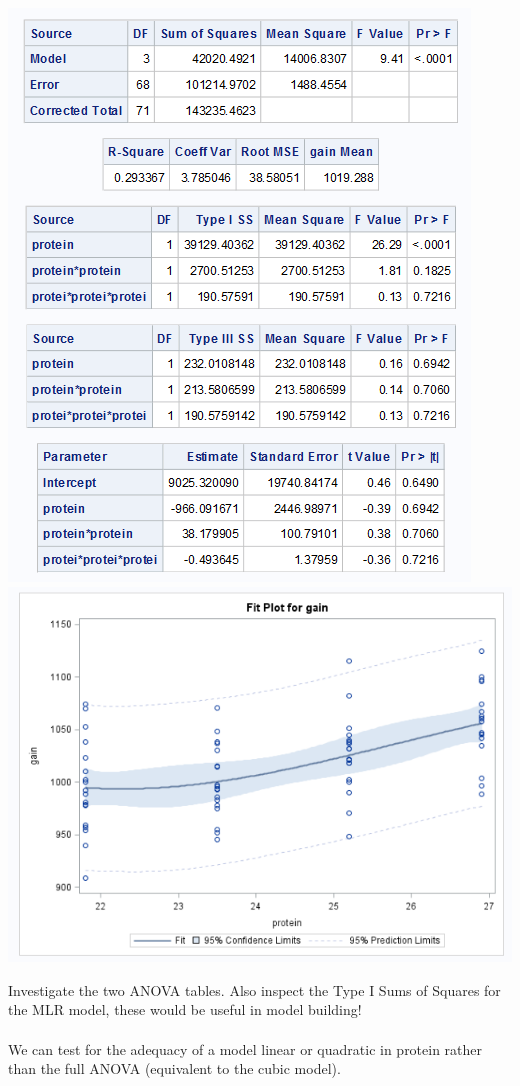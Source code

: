 \begin{flushleft}
\includegraphics[scale=0.8]{ChickensGLM2}\includegraphics[scale=0.5]{ChickensScatter}
\end{flushleft}

Investigate the two ANOVA tables.  Also inspect the Type I Sums of Squares for the MLR model, these would be useful in model building! \\~\\
We can test for the adequacy of a model linear or quadratic in protein rather than the full ANOVA (equivalent to the cubic model).\\~\\

